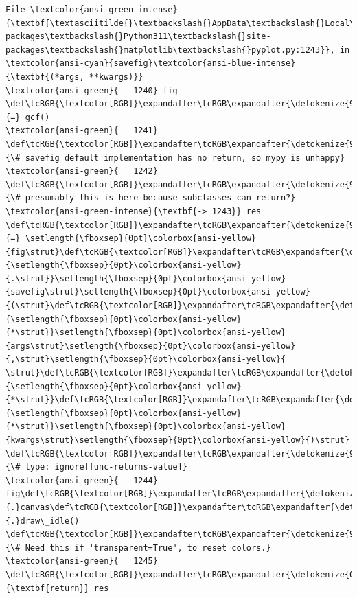 \documentclass[11pt]{article}
\begin{document}
\begin{Verbatim}[commandchars=\\\{\}, frame=single, framerule=2mm, rulecolor=\color{outerrorbackground}]
File \textcolor{ansi-green-intense}{\textbf{\textasciitilde{}\textbackslash{}AppData\textbackslash{}Local\textbackslash{}Packages\textbackslash{}PythonSoftwareFoundation.Python.3.11\_qbz5n2kfra8p0\textbackslash{}LocalCache\textbackslash{}local-packages\textbackslash{}Python311\textbackslash{}site-packages\textbackslash{}matplotlib\textbackslash{}pyplot.py:1243}}, in \textcolor{ansi-cyan}{savefig}\textcolor{ansi-blue-intense}{\textbf{(*args, **kwargs)}}
\textcolor{ansi-green}{   1240} fig \def\tcRGB{\textcolor[RGB]}\expandafter\tcRGB\expandafter{\detokenize{98,98,98}}{=} gcf()
\textcolor{ansi-green}{   1241} \def\tcRGB{\textcolor[RGB]}\expandafter\tcRGB\expandafter{\detokenize{95,135,135}}{\# savefig default implementation has no return, so mypy is unhappy}
\textcolor{ansi-green}{   1242} \def\tcRGB{\textcolor[RGB]}\expandafter\tcRGB\expandafter{\detokenize{95,135,135}}{\# presumably this is here because subclasses can return?}
\textcolor{ansi-green-intense}{\textbf{-> 1243}} res \def\tcRGB{\textcolor[RGB]}\expandafter\tcRGB\expandafter{\detokenize{98,98,98}}{=} \setlength{\fboxsep}{0pt}\colorbox{ansi-yellow}{fig\strut}\def\tcRGB{\textcolor[RGB]}\expandafter\tcRGB\expandafter{\detokenize{98,98,98}}{\setlength{\fboxsep}{0pt}\colorbox{ansi-yellow}{.\strut}}\setlength{\fboxsep}{0pt}\colorbox{ansi-yellow}{savefig\strut}\setlength{\fboxsep}{0pt}\colorbox{ansi-yellow}{(\strut}\def\tcRGB{\textcolor[RGB]}\expandafter\tcRGB\expandafter{\detokenize{98,98,98}}{\setlength{\fboxsep}{0pt}\colorbox{ansi-yellow}{*\strut}}\setlength{\fboxsep}{0pt}\colorbox{ansi-yellow}{args\strut}\setlength{\fboxsep}{0pt}\colorbox{ansi-yellow}{,\strut}\setlength{\fboxsep}{0pt}\colorbox{ansi-yellow}{ \strut}\def\tcRGB{\textcolor[RGB]}\expandafter\tcRGB\expandafter{\detokenize{98,98,98}}{\setlength{\fboxsep}{0pt}\colorbox{ansi-yellow}{*\strut}}\def\tcRGB{\textcolor[RGB]}\expandafter\tcRGB\expandafter{\detokenize{98,98,98}}{\setlength{\fboxsep}{0pt}\colorbox{ansi-yellow}{*\strut}}\setlength{\fboxsep}{0pt}\colorbox{ansi-yellow}{kwargs\strut}\setlength{\fboxsep}{0pt}\colorbox{ansi-yellow}{)\strut}  \def\tcRGB{\textcolor[RGB]}\expandafter\tcRGB\expandafter{\detokenize{95,135,135}}{\# type: ignore[func-returns-value]}
\textcolor{ansi-green}{   1244} fig\def\tcRGB{\textcolor[RGB]}\expandafter\tcRGB\expandafter{\detokenize{98,98,98}}{.}canvas\def\tcRGB{\textcolor[RGB]}\expandafter\tcRGB\expandafter{\detokenize{98,98,98}}{.}draw\_idle()  \def\tcRGB{\textcolor[RGB]}\expandafter\tcRGB\expandafter{\detokenize{95,135,135}}{\# Need this if 'transparent=True', to reset colors.}
\textcolor{ansi-green}{   1245} \def\tcRGB{\textcolor[RGB]}\expandafter\tcRGB\expandafter{\detokenize{0,135,0}}{\textbf{return}} res


\end{Verbatim}
\end{document}
